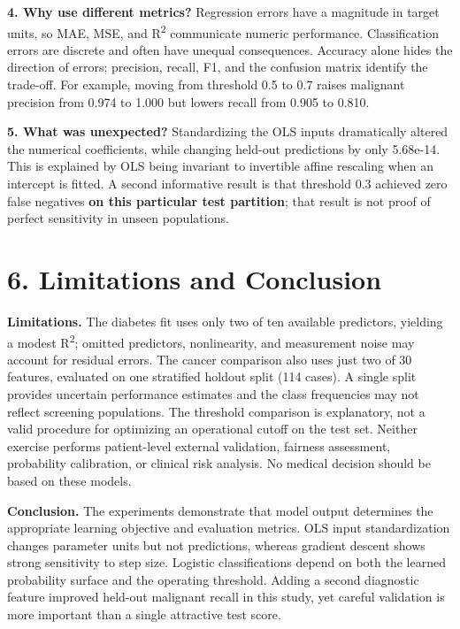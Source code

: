 \documentclass[
  10pt,
]{article}
\begin{document}
\textbf{4. Why use different metrics?} Regression errors have a
magnitude in target units, so MAE, MSE, and R\textsuperscript{2} communicate numeric
performance. Classification errors are discrete and often have unequal
consequences. Accuracy alone hides the direction of errors; precision,
recall, F1, and the confusion matrix identify the trade-off. For
example, moving from threshold 0.5 to 0.7 raises malignant precision
from 0.974 to 1.000 but lowers recall from 0.905 to 0.810.

\textbf{5. What was unexpected?} Standardizing the OLS inputs
dramatically altered the numerical coefficients, while changing held-out
predictions by only 5.68e-14. This is explained by OLS being invariant
to invertible affine rescaling when an intercept is fitted. A second
informative result is that threshold 0.3 achieved zero false negatives
\textbf{on this particular test partition}; that result is not proof of
perfect sensitivity in unseen populations.

\section{6. Limitations and
Conclusion}\label{limitations-and-conclusion}

\textbf{Limitations.} The diabetes fit uses only two of ten available
predictors, yielding a modest R\textsuperscript{2}; omitted predictors, nonlinearity, and
measurement noise may account for residual errors. The cancer comparison
also uses just two of 30 features, evaluated on one stratified holdout
split (114 cases). A single split provides uncertain performance
estimates and the class frequencies may not reflect screening
populations. The threshold comparison is explanatory, not a valid
procedure for optimizing an operational cutoff on the test set. Neither
exercise performs patient-level external validation, fairness
assessment, probability calibration, or clinical risk analysis. No
medical decision should be based on these models.

\textbf{Conclusion.} The experiments demonstrate that model output
determines the appropriate learning objective and evaluation metrics.
OLS input standardization changes parameter units but not predictions,
whereas gradient descent shows strong sensitivity to step size. Logistic
classifications depend on both the learned probability surface and the
operating threshold. Adding a second diagnostic feature improved
held-out malignant recall in this study, yet careful validation is more
important than a single attractive test score.
\end{document}
